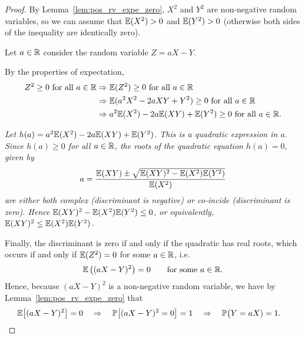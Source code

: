 \begin{proof}
By Lemma~\ref{lem:pos_rv_expe_zero}, $X^2$ and $Y^2$ are non-negative random variables, so we can assume that $\mathbb{E}(X^2)>0$ and $\mathbb{E}(Y^2)>0$ (otherwise both sides of the inequality are identically zero).

Let $a\in\mathbb{R}$ consider the random variable $Z=aX-Y$. 
\par
By the properties of expectation,
\begin{align*}
Z^2\geq 0 \text{ for all } a\in\mathbb{R}
	& \Rightarrow \mathbb{E}(Z^2)\geq 0 \text{ for all } a\in\mathbb{R} \\
	& \Rightarrow \mathbb{E}(a^2X^2 - 2aXY + Y^2) \geq 0 \text{ for all } a\in\mathbb{R} \\
	& \Rightarrow a^2\mathbb{E}(X^2) - 2a\mathbb{E}(XY) + \mathbb{E}(Y^2) \geq 0 \text{ for all } a\in\mathbb{R}.
\end{align*}

\bit
\it Let $h(a)=a^2\mathbb{E}(X^2) - 2a\mathbb{E}(XY) + \mathbb{E}(Y^2)$. This is a quadratic expression in $a$.
\eit
Since $h(a)\geq 0$ for all $a\in\mathbb{R}$, the roots of the quadratic equation $h(a)=0$, given by
\[
a = \frac{\mathbb{E}(XY)\pm\sqrt{\mathbb{E}(XY)^2-\mathbb{E}(X^2)\mathbb{E}(Y^2)}}{\mathbb{E}(X^2)}
\]
are either both complex (discriminant is negative) or co-incide (discriminant is zero). 
\bit
\it Hence $\mathbb{E}(XY)^2-\mathbb{E}(X^2)\mathbb{E}(Y^2) \leq 0$, or equivalently, $\mathbb{E}(XY)^2\leq \mathbb{E}(X^2)\mathbb{E}(Y^2)$.
\eit

Finally, the discriminant is zero if and only if the quadratic has real roots, which occurs if and only if $\mathbb{E}(Z^2)=0$ for some $a\in\mathbb{R}$, i.e.
\[
\mathbb{E}\left((aX-Y)^2\right) = 0\qquad\text{for some $a\in\mathbb{R}$.}
\]
Hence, because $(aX-Y)^2$ is a non-negative random variable, we have by Lemma~\ref{lem:pos_rv_expe_zero} that
\begin{align*}
\mathbb{E}\big[(aX-Y)^2\big]=0
		& \quad\Rightarrow\quad \mathbb{P}\big[(aX-Y)^2 = 0\big] = 1 
		\quad\Rightarrow\quad \mathbb{P}\big(Y = aX) = 1. 
\end{align*}		
\end{proof}


